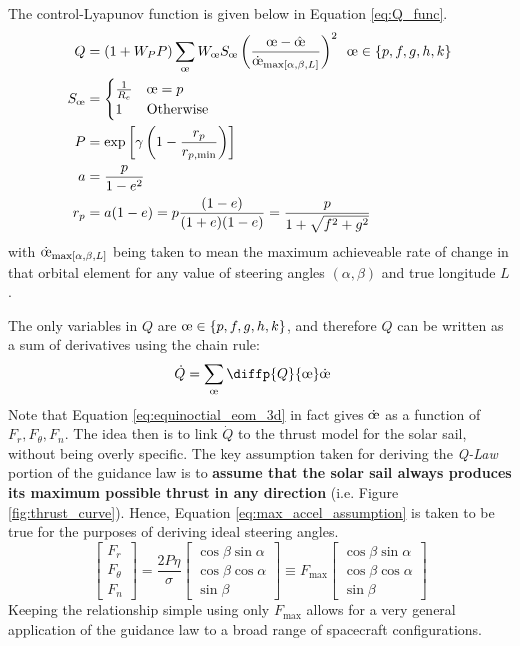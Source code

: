 The control-Lyapunov function is given below in Equation \ref{eq:Q_func}.
\begin{align}
    Q &= (1+W_P P) \sum_{\moe} W_{\moe} S_{\moe} \left(\frac{\moe - \hat{\moe}}{\dot{\moe}_{\maxrocall}} \right)^2 \ \, \moe \in \{p, f, g, h, k\} \label{eq:Q_func}\\
    S_{\moe} &= \begin{cases}
    \frac{1}{R_e} & \moe = p\\
    1 & \text{Otherwise}\\
    \end{cases} \nonumber\\
    P &= \exp\left[\gamma \left( 1 - \frac{r_p}{r_{p, \text{min}}} \right) \right] \nonumber\\
    a &= \frac{p}{1-e^2} \nonumber\\
    r_{p} &= a (1-e) = p\frac{(1-e)}{(1+e)(1-e)} = \frac{p}{1+\sqrt{f^2 + g^2}} \nonumber
\end{align}
with $\dot{\moe}_{\maxrocall}$ being taken to mean the maximum achieveable rate of change in that orbital element for any value of steering angles $(\alpha, \beta)$ and true longitude $L$.

The only variables in $Q$ are $\moe \in \{p, f, g, h, k\}$, and therefore $Q$ can be written as a sum of derivatives using the chain rule:
\begin{align*}
    \dot{Q} &= \sum_{\moe} \diffp{Q}{{\moe}} \dot{\moe}
\end{align*}
Note that Equation \ref{eq:equinoctial_eom_3d} in fact gives $\dot{\moe}$ as a function of $F_r, F_\theta, F_n$. The idea then is to link $\dot{Q}$ to the thrust model for the solar sail, without being overly specific. The key assumption taken for deriving the \textit{Q-Law} portion of the guidance law is to \textbf{assume that the solar sail always produces its maximum possible thrust in any direction} (i.e. Figure \ref{fig:thrust_curve}). Hence, Equation \ref{eq:max_accel_assumption} is taken to be true for the purposes of deriving ideal steering angles.
\begin{equation}
    \begin{bmatrix}
        F_r\\
        F_\theta\\
        F_n
    \end{bmatrix} =
    \frac{2P\eta}{\sigma}
    \begin{bmatrix}
        \cos \beta \sin \alpha\\
        \cos \beta \cos \alpha\\
        \sin \beta
    \end{bmatrix} 
    \equiv 
    F_{\max}
    \begin{bmatrix}
        \cos \beta \sin \alpha\\
        \cos \beta \cos \alpha\\
        \sin \beta
    \end{bmatrix}
    \label{eq:max_accel_assumption}
\end{equation}
Keeping the relationship simple using only $F_{\max}$ allows for a very general application of the guidance law to a broad range of spacecraft configurations.

